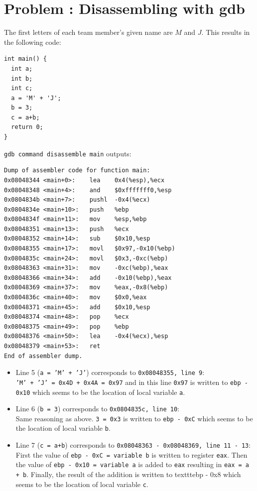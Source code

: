 \documentclass[12pt]{scrartcl}
\newcounter{exnum}
\newcommand{\exercise}[1]{\section*{Problem \theexnum\stepcounter{exnum}: #1}}
\begin{document}
\setcounter{exnum}{1}

\exercise{Disassembling with gdb}

The first letters of each team member's given name are $M$ and $J$.
This results in the following code:

\begin{lstlisting}
int main() {
  int a;
  int b;
  int c;
  a = 'M' + 'J';
  b = 3;
  c = a+b;
  return 0;
}
\end{lstlisting}

\texttt{gdb command disassemble main} outputs:
\begin{lstlisting}[language={}]
Dump of assembler code for function main:
0x08048344 <main+0>:	lea    0x4(%esp),%ecx
0x08048348 <main+4>:	and    $0xfffffff0,%esp
0x0804834b <main+7>:	pushl  -0x4(%ecx)
0x0804834e <main+10>:	push   %ebp
0x0804834f <main+11>:	mov    %esp,%ebp
0x08048351 <main+13>:	push   %ecx
0x08048352 <main+14>:	sub    $0x10,%esp
0x08048355 <main+17>:	movl   $0x97,-0x10(%ebp)
0x0804835c <main+24>:	movl   $0x3,-0xc(%ebp)
0x08048363 <main+31>:	mov    -0xc(%ebp),%eax
0x08048366 <main+34>:	add    -0x10(%ebp),%eax
0x08048369 <main+37>:	mov    %eax,-0x8(%ebp)
0x0804836c <main+40>:	mov    $0x0,%eax
0x08048371 <main+45>:	add    $0x10,%esp
0x08048374 <main+48>:	pop    %ecx
0x08048375 <main+49>:	pop    %ebp
0x08048376 <main+50>:	lea    -0x4(%ecx),%esp
0x08048379 <main+53>:	ret    
End of assembler dump.
\end{lstlisting}

\begin{itemize}
    \item Line 5 (\texttt{a = 'M' + 'J'}) corresponds to \texttt{0x08048355, line 9}:\\
          \texttt{'M' + 'J' = 0x4D + 0x4A = 0x97} and in this line \texttt{0x97} is written to 
          \texttt{ebp - 0x10} which seems to be the location of local variable \texttt{a}.
    \item Line 6 (\texttt{b = 3}) corresponds to \texttt{0x0804835c, line 10}:\\
          Same reasoning as above. \texttt{3 = 0x3} is written to \texttt{ebp - 0xC}
          which seems to be the location of local variable \texttt{b}.
    \item Line 7 (\texttt{c = a+b}) corresponds to \texttt{0x08048363 - 0x08048369, line 11 - 13}:\\
          First the value of \texttt{ebp - 0xC = variable b} is written to register \texttt{eax}. Then
          the value of \texttt{ebp - 0x10 = variable a} is added to \texttt{eax} resulting in \texttt{eax = a + b}.
          Finally, the result of the addition is written to texttt{ebp - 0x8} which seems to be the location of local variable \texttt{c}.
\end{itemize}
\end{document}
